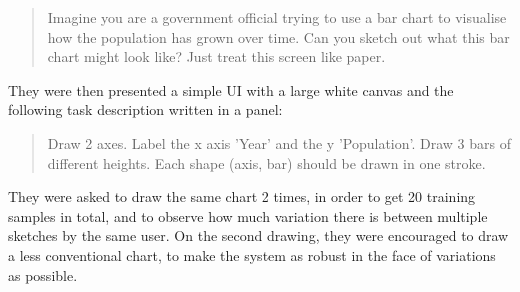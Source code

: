 	\begin{quotation}
	Imagine you are a government official trying to use a bar chart to visualise how the population has grown over time. Can you sketch out what this bar chart might look like? Just treat this screen like paper.
	\end{quotation}
	
	 They were then presented a simple UI with a large white canvas and the following task description written in a panel:
	
	\begin{quotation}
	Draw 2 axes. Label the x axis 'Year' and the y 'Population'. Draw 3 bars of different heights. Each shape (axis, bar) should be drawn in one stroke.
	\end{quotation}
	
%	
%	
%
%	
	
	They were asked to draw the same chart 2 times, in order to get 20 training samples in total, and to observe how much variation there is between multiple sketches by the same user. On the second drawing, they were encouraged to draw a less conventional chart, to make the system as robust in the face of variations as possible. 
		
